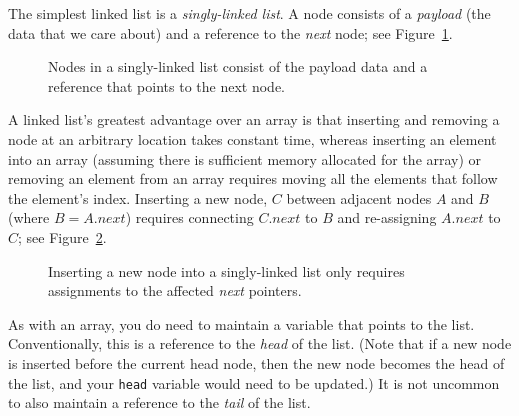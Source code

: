 The simplest linked list is a \textit{singly-linked list}.
A node consists of a \textit{payload} (the data that we care about) and a reference to the \textit{next} node;
see Figure~\ref{fig:singly-linked-list}.

\begin{figure}[h]
    \centering
    \caption{Nodes in a singly-linked list consist of the payload data and a reference that points to the next node.}\label{fig:singly-linked-list}
\end{figure}

A linked list's greatest advantage over an array is that inserting and removing a node at an arbitrary location takes constant time, whereas inserting an element into an array (assuming there is sufficient memory allocated for the array) or removing an element from an array requires moving all the elements that follow the element's index.
Inserting a new node, $C$ between adjacent nodes $A$ and $B$ (where $B = A.next$) requires connecting $C.next$ to $B$ and re-assigning $A.next$ to $C$;
see Figure~\ref{fig:sll-insertion}.

\begin{figure}[h]
    \centering
    \caption{Inserting a new node into a singly-linked list only requires assignments to the affected \textit{next} pointers.}\label{fig:sll-insertion}
\end{figure}

As with an array, you do need to maintain a variable that points to the list.
Conventionally, this is a reference to the \textit{head} of the list.
(Note that if a new node is inserted before the current head node, then the new node becomes the head of the list, and your \lstinline{head} variable would need to be updated.)
It is not uncommon to also maintain a reference to the \textit{tail} of the list.

